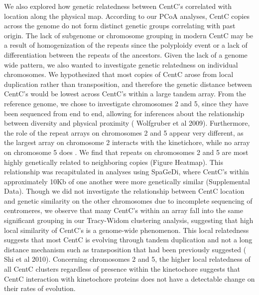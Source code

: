We also explored how genetic relatedness between CentC’s correlated with location along the physical map.  According to our PCoA analyses, CentC copies across the genome do not form distinct genetic groups correlating with past origin.  The lack of subgenome or chromosome grouping in modern CentC may be a result of homogenization of the repeats since the polyploidy event or a lack of differentiation between the repeats of the ancestors.    Given the lack of a genome wide pattern, we also wanted to investigate genetic relatedness on individual chromosomes.  We hypothesized that most copies of CentC arose from local duplication rather than transposition, and therefore the genetic distance between CentC’s would be lowest across CentC’s within a large tandem array.   From the reference genome, we chose to investigate chromosomes 2 and 5, since they have been sequenced from end to end, allowing for inferences about the relationship between diversity and physical proximity ( Wolfgruber et al 2009).  Furthermore, the role of the repeat arrays on chromosomes 2 and 5 appear very different, as the largest array on chromosome 2 interacts with the kinetichore, while no array on chromosome 5 does .  We find that repeats on chromosomes 2 and 5 are most highly genetically related to neighboring copies (Figure Heatmap).  This relationship was recapitulated in analyses using SpaGeDi, where CentC’s within approximately 10Kb of one another were more genetically similar (Supplemental Data).  Though we did not investigate the relationship between CentC location and genetic similarity on the other chromosomes due to incomplete sequencing of centromeres, we observe that many CentC’s within an array fall into the same  significant grouping in our Tracy-Widom clustering analysis, suggesting that high local similarity of CentC’s is a genome-wide phenomenon.  This local relatedness suggests that most CentC is evolving through tandem duplication and not a long distance mechanism such as transposition that had been previously suggested ( Shi et al 2010).  Concerning chromosomes 2 and 5, the higher local relatedness of all CentC clusters regardless of presence within the kinetochore suggests that CentC interaction with kinetochore proteins does not have a detectable change on their rates of evolution.

